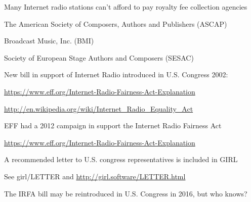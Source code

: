 \documentclass[20pt,landscape]{foils}
\begin{document}
\begin{list1}
\item Many Internet radio stations can't afford to pay royalty fee collection agencies
  \begin{list2}
  \item The American Society of Composers, Authors and Publishers (ASCAP)
  \item Broadcast Music, Inc. (BMI)
    \item Society of European Stage Authors and Composers (SESAC)
  \end{list2}
  \item New bill in support of Internet Radio introduced in U.S. Congress 2002:
  \begin{list2}
  \item \url{https://www.eff.org/Internet-Radio-Fairness-Act-Explanation}
  \item \url{http://en.wikipedia.org/wiki/Internet_Radio_Equality_Act}
  \end{list2}
\item EFF had a 2012 campaign in support the Internet Radio Fairness Act
  \begin{list2}
  \item \url{https://www.eff.org/Internet-Radio-Fairness-Act-Explanation}
  \end{list2}
\item A recommended letter to U.S. congress representatives is included in GIRL
  \begin{list2}
  \item See girl/LETTER and \url{http://girl.software/LETTER.html}
  \end{list2}
\item The IRFA bill may be reintroduced in U.S. Congress in 2016, but who knows?
\end{list1}

\end{document}
